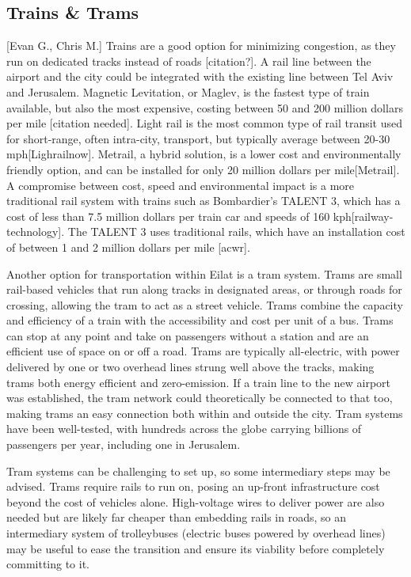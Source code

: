 \documentclass[12pt]{article}                         %
\begin{document}
\subsection{Trains \& Trams}[Evan G., Chris M.]
Trains are a good option for minimizing congestion, as they run on dedicated tracks instead of roads [citation?]. A rail line between the airport and the city could be integrated with the existing line between Tel Aviv and Jerusalem. Magnetic Levitation, or Maglev, is the fastest type of train available, but also the most expensive, costing between 50 and 200 million dollars per mile [citation needed]. Light rail is the most common type of rail transit used for short-range, often intra-city, transport, but typically average between 20-30 mph[Lighrailnow]. Metrail, a hybrid solution, is a lower cost and environmentally friendly option, and can be installed for only 20 million dollars per mile[Metrail]. A compromise between cost, speed and environmental impact is a more traditional rail system with trains such as Bombardier's TALENT 3, which has a cost of less than 7.5 million dollars per train car and speeds of 160 kph[railway-technology]. The TALENT 3 uses traditional rails, which have an installation cost of between 1 and 2 million dollars per mile [acwr].

Another option for transportation within Eilat is a tram system. Trams are small rail-based vehicles that run along tracks in designated areas, or through roads for crossing, allowing the tram to act as a street vehicle. Trams combine the capacity and efficiency of a train with the accessibility and cost per unit of a bus. Trams can stop at any point and take on passengers without a station and are an efficient use of space on or off a road. Trams are typically all-electric, with power delivered by one or two overhead lines strung well above the tracks, making trams both energy efficient and zero-emission. If a train line to the new airport was established, the tram network could theoretically be connected to that too, making trams an easy connection both within and outside the city. Tram systems have been well-tested, with hundreds across the globe carrying billions of passengers per year, including one in Jerusalem.

Tram systems can be challenging to set up, so some intermediary steps may be advised. Trams require rails to run on, posing an up-front infrastructure cost beyond the cost of vehicles alone. High-voltage wires to deliver power are also needed but are likely far cheaper than embedding rails in roads, so an intermediary system of trolleybuses (electric buses powered by overhead lines) may be useful to ease the transition and ensure its viability before completely committing to it. 
\end{document}
